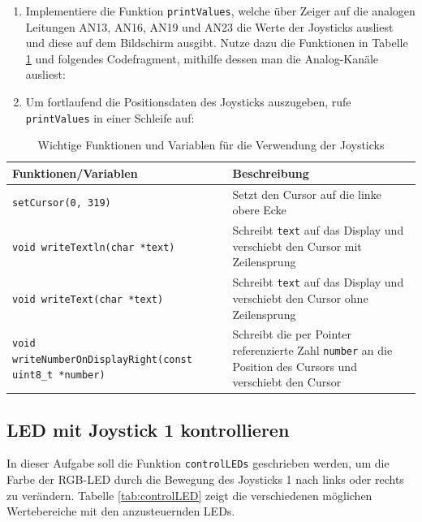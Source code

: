 \begin{enumerate}
\item
Implementiere die Funktion \lstinline|printValues|, welche über Zeiger auf die analogen Leitungen AN13, AN16, AN19 und AN23 die Werte der Joysticks ausliest und diese auf dem Bildschirm ausgibt.  
Nutze dazu die Funktionen in Tabelle \ref{tab:joystickInfo} und folgendes Codefragment, mithilfe dessen man die Analog-Kanäle ausliest:


\item 
Um fortlaufend die Positionsdaten des Joysticks auszugeben, rufe \lstinline|printValues| in einer Schleife auf:

\end{enumerate}

\begin{table}[!htb]
    \centering
    \caption{Wichtige Funktionen und Variablen für die Verwendung der Joysticks}
    \label{tab:joystickInfo}
    \begin{tabular}{p{7cm}p{7cm}}
        \toprule
        \textbf{Funktionen/Variablen} & \textbf{Beschreibung} \\
        \midrule
        \lstinline|setCursor(0, 319)| & Setzt den Cursor auf die linke obere Ecke\\
        \lstinline|void writeTextln(char *text)| & Schreibt \lstinline|text| auf das Display und verschiebt den Cursor mit Zeilensprung \\
        \lstinline|void writeText(char *text)| & Schreibt \lstinline|text| auf das Display und verschiebt den Cursor ohne Zeilensprung \\
        \lstinline|void writeNumberOnDisplayRight(const uint8_t *number)| & Schreibt die per Pointer referenzierte Zahl \lstinline|number| an die Position des Cursors und verschiebt den Cursor\\
        \bottomrule
    \end{tabular}
\end{table}


\subsection{LED mit Joystick 1 kontrollieren}
In dieser Aufgabe soll die Funktion \lstinline|controlLEDs| geschrieben werden, um die Farbe der RGB-LED durch die Bewegung des Joysticks 1 nach links oder rechts zu verändern.
Tabelle \ref{tab:controlLED} zeigt die verschiedenen möglichen Wertebereiche mit den anzusteuernden LEDs.

